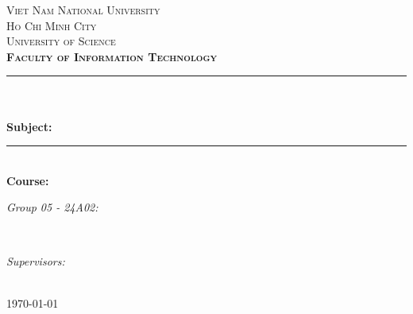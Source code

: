 \begin{titlepage}
\newcommand{\HRule}{\rule{\linewidth}{0.5mm}}
\centering

\textsc{\LARGE Viet Nam National University}\\[0.5cm]
\textsc{\LARGE Ho Chi Minh City}\\[0.5cm]
\textsc{\Large University of Science}\\[0.5cm]
\textsc{\large \textbf{Faculty of Information Technology}}\\[0.5cm]

\HRule \\[0.4cm]
{ 
\huge{\bfseries{\reporttitle}}\\[0.5cm]
\large{\bfseries{Subject: \reportname}}
}\\[0.4cm]
\HRule \\[0.5cm]

\textbf{\large Course: \coursename}\\[0.5cm]

\begin{minipage}[t]{0.5\textwidth} %
\begin{flushleft} \large
\emph{Group 05 - 24A02:}\\
\studentname
\end{flushleft}
\end{minipage}
~
\begin{minipage}[t]{0.4\textwidth} %
\begin{flushright} \large
\emph{Supervisors:} \\
\teachername
\end{flushright}
\end{minipage}\\[1cm]

{\large \today}\\[1cm]

\vfill
\end{titlepage}
